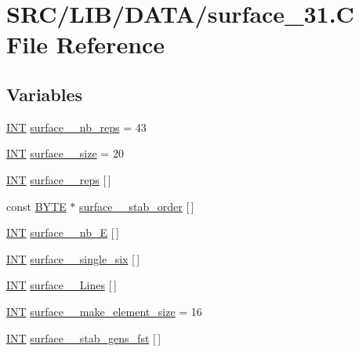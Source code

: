 \hypertarget{surface__31_8_c}{}\section{S\+R\+C/\+L\+I\+B/\+D\+A\+T\+A/surface\+\_\+31.C File Reference}
\label{surface__31_8_c}
\subsection*{Variables}
\begin{DoxyCompactItemize}
\item 
\mbox{\hyperlink{galois_8h_a09fddde158a3a20bd2dcadb609de11dc}{I\+NT}} \mbox{\hyperlink{surface__31_8_c_ab41158e4ef020a2a48062f40c8d86f32}{surface\+\_\+\_\+nb\+\_\+reps}} = 43
\item 
\mbox{\hyperlink{galois_8h_a09fddde158a3a20bd2dcadb609de11dc}{I\+NT}} \mbox{\hyperlink{surface__31_8_c_a3e9ad4c832add21981e331c53d80637f}{surface\+\_\+\_\+size}} = 20
\item 
\mbox{\hyperlink{galois_8h_a09fddde158a3a20bd2dcadb609de11dc}{I\+NT}} \mbox{\hyperlink{surface__31_8_c_a690eeafa5634ca7633bdcb83802ca8b8}{surface\+\_\+\_\+reps}} \mbox{[}$\,$\mbox{]}
\item 
const \mbox{\hyperlink{galois_8h_ab6cc7b4aeb6ea31aba2b3fbfc83ff5e6}{B\+Y\+TE}} $\ast$ \mbox{\hyperlink{surface__31_8_c_a0657293ce166bab01bfee224a8e62e2e}{surface\+\_\+\_\+stab\+\_\+order}} \mbox{[}$\,$\mbox{]}
\item 
\mbox{\hyperlink{galois_8h_a09fddde158a3a20bd2dcadb609de11dc}{I\+NT}} \mbox{\hyperlink{surface__31_8_c_af0f1763eb95c99dfacf69be20ab8105e}{surface\+\_\+\_\+nb\+\_\+E}} \mbox{[}$\,$\mbox{]}
\item 
\mbox{\hyperlink{galois_8h_a09fddde158a3a20bd2dcadb609de11dc}{I\+NT}} \mbox{\hyperlink{surface__31_8_c_ae27dc82ddbbb4baa3eeb935a8abd4b8c}{surface\+\_\+\_\+single\+\_\+six}} \mbox{[}$\,$\mbox{]}
\item 
\mbox{\hyperlink{galois_8h_a09fddde158a3a20bd2dcadb609de11dc}{I\+NT}} \mbox{\hyperlink{surface__31_8_c_a0d1e17f588dbbdabee7a0fb8602eedf7}{surface\+\_\+\_\+\+Lines}} \mbox{[}$\,$\mbox{]}
\item 
\mbox{\hyperlink{galois_8h_a09fddde158a3a20bd2dcadb609de11dc}{I\+NT}} \mbox{\hyperlink{surface__31_8_c_a5e5aeecff107b372b4fa4fbae22210cd}{surface\+\_\+\_\+make\+\_\+element\+\_\+size}} = 16
\item 
\mbox{\hyperlink{galois_8h_a09fddde158a3a20bd2dcadb609de11dc}{I\+NT}} \mbox{\hyperlink{surface__31_8_c_a5e4fe205d9fab193f4087367540b873d}{surface\+\_\+\_\+stab\+\_\+gens\+\_\+fst}} \mbox{[}$\,$\mbox{]}

\end{DoxyCompactItemize}
